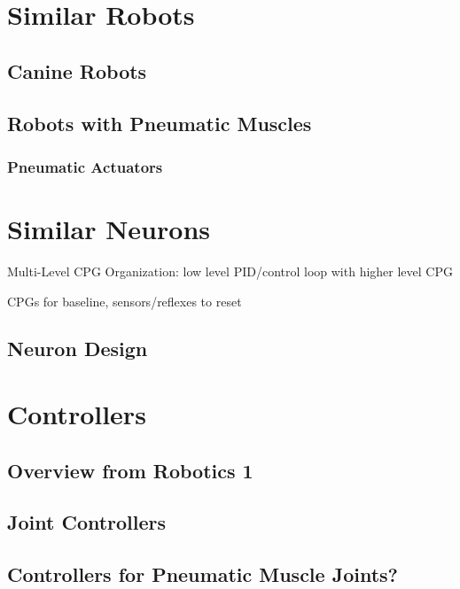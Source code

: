 \section{Similar Robots}

\subsection{Canine Robots}

\subsection{Robots with Pneumatic Muscles}

\subsubsection{Pneumatic Actuators}

\cite{HuntPMuscles}
\cite{DynamicPMuscles}

\cite{einstein}

\section{Similar Neurons}

Multi-Level CPG Organization: low level PID/control loop with higher level CPG
\cite{MultiLevelCPG}

CPGs for baseline, sensors/reflexes to reset \cite{SixLeggedWalking}

\subsection{Neuron Design}

\section{Controllers}

\subsection{Overview from Robotics 1}

\subsection{Joint Controllers}

\subsection{Controllers for Pneumatic Muscle Joints?}

